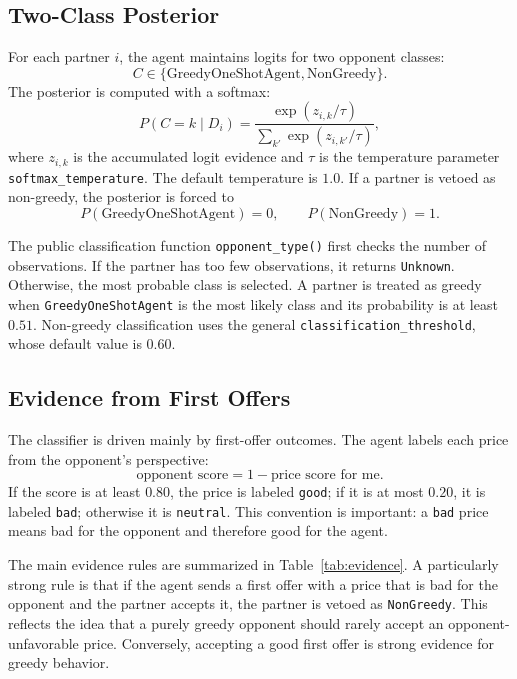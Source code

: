 \documentclass[11pt]{article}
\begin{document}
\subsection{Two-Class Posterior}

For each partner \(i\), the agent maintains logits for two opponent classes:
\[
  C \in \{\text{GreedyOneShotAgent}, \text{NonGreedy}\}.
\]
The posterior is computed with a softmax:
\[
  P(C=k \mid D_i)
  =
  \frac{\exp(z_{i,k}/\tau)}
       {\sum_{k'} \exp(z_{i,k'}/\tau)},
\]
where \(z_{i,k}\) is the accumulated logit evidence and \(\tau\) is the
temperature parameter \texttt{softmax\_temperature}.  The default temperature is
\(1.0\).  If a partner is vetoed as non-greedy, the posterior is forced to
\[
  P(\text{GreedyOneShotAgent}) = 0,\qquad
  P(\text{NonGreedy}) = 1.
\]

The public classification function \texttt{opponent\_type()} first checks the
number of observations.  If the partner has too few observations, it returns
\texttt{Unknown}.  Otherwise, the most probable class is selected.  A partner is
treated as greedy when \texttt{GreedyOneShotAgent} is the most likely class and
its probability is at least \(0.51\).  Non-greedy classification uses the
general \texttt{classification\_threshold}, whose default value is \(0.60\).

\subsection{Evidence from First Offers}

The classifier is driven mainly by first-offer outcomes.  The agent labels each
price from the opponent's perspective:
\[
\text{opponent score} = 1 - \text{price score for me}.
\]
If the score is at least \(0.80\), the price is labeled \texttt{good}; if it is
at most \(0.20\), it is labeled \texttt{bad}; otherwise it is
\texttt{neutral}.  This convention is important: a \texttt{bad} price means bad
for the opponent and therefore good for the agent.

The main evidence rules are summarized in Table~\ref{tab:evidence}.  A
particularly strong rule is that if the agent sends a first offer with a price
that is bad for the opponent and the partner accepts it, the partner is vetoed
as \texttt{NonGreedy}.  This reflects the idea that a purely greedy opponent
should rarely accept an opponent-unfavorable price.  Conversely, accepting a
good first offer is strong evidence for greedy behavior.
\end{document}
